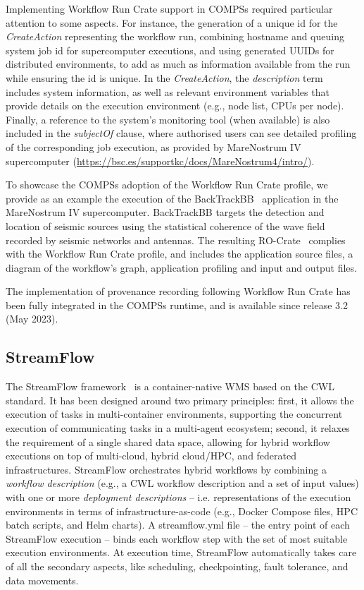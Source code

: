 \documentclass[10pt,letterpaper]{article}
\begin{document}
Implementing Workflow Run Crate support in COMPSs required particular attention to some aspects.
For instance, the generation of a unique id for the \emph{CreateAction} representing the workflow run, combining hostname and queuing system job id for supercomputer executions, and using generated UUIDs for distributed environments, to add as much as information available from the run while ensuring the id is unique.
In the \emph{CreateAction}, the \emph{description} term includes system information, as well as relevant environment variables that provide details on the execution environment (e.g., node list, CPUs per node).
Finally, a reference to the system's monitoring tool (when available) is also included in the \emph{subjectOf} clause, where authorised users can see detailed profiling of the corresponding job execution, as provided by MareNostrum IV supercomputer (\url{https://bsc.es/supportkc/docs/MareNostrum4/intro/}).

To showcase the COMPSs adoption of the Workflow Run Crate profile, we provide as an example the execution of the BackTrackBB~\cite{Poiata 2016}
application in the MareNostrum IV supercomputer.
BackTrackBB targets the detection and location of seismic sources using the statistical coherence of the wave field recorded by seismic networks and antennas.
The resulting RO-Crate~\cite{Poiata 2023} complies with the Workflow Run Crate profile, and includes the application source files, a diagram of the workflow's graph, application profiling and input and output files.

The implementation of provenance recording following Workflow Run Crate has been fully integrated in the COMPSs runtime, and is available since release 3.2 (May 2023).


\subsection{StreamFlow}\label{streamflow}

The StreamFlow framework~\cite{Colonnelli 2020} is a container-native WMS based on the CWL standard.
It has been designed around two primary principles: first, it allows the execution of tasks in multi-container environments, supporting the concurrent execution of communicating tasks in a multi-agent ecosystem; second, it relaxes the requirement of a single shared data space, allowing for hybrid workflow executions on top of multi-cloud, hybrid cloud/HPC, and federated infrastructures.
StreamFlow orchestrates hybrid workflows by combining a \emph{workflow description} (e.g., a CWL workflow description and a set of input values) with one or more \emph{deployment descriptions} -- i.e.
representations of the execution environments in terms of infrastructure-as-code (e.g., Docker Compose files, HPC batch scripts, and Helm charts).
A streamflow.yml file -- the entry point of each StreamFlow execution -- binds each workflow step with the set of most suitable execution environments.
At execution time, StreamFlow automatically takes care of all the secondary aspects, like scheduling, checkpointing, fault tolerance, and data movements.
\end{document}
